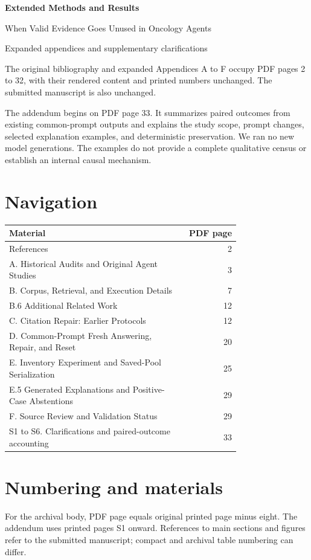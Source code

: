 \documentclass[11pt]{article}
\begin{document}
\begin{center}
{\Large\bfseries Extended Methods and Results}\par\medskip
{\large When Valid Evidence Goes Unused in Oncology Agents}\par\medskip
Expanded appendices and supplementary clarifications
\end{center}
\bigskip
The original bibliography and expanded Appendices A to F occupy PDF pages
2 to 32, with their rendered content and printed numbers unchanged. The
submitted manuscript is also unchanged.

The addendum begins on PDF page 33. It summarizes paired outcomes from existing
common-prompt outputs and explains the study scope, prompt changes, selected
explanation examples, and deterministic preservation. We ran no new model
generations. The examples do not provide a complete qualitative census or
establish an internal causal mechanism.

\section*{Navigation}
\begin{tabular}{@{}p{0.76\linewidth}r@{}}
\toprule
Material & PDF page\\
\midrule
References & 2\\
A. Historical Audits and Original Agent Studies & 3\\
B. Corpus, Retrieval, and Execution Details & 7\\
\quad B.6 Additional Related Work & 12\\
C. Citation Repair: Earlier Protocols & 12\\
D. Common-Prompt Fresh Answering, Repair, and Reset & 20\\
E. Inventory Experiment and Saved-Pool Serialization & 25\\
\quad E.5 Generated Explanations and Positive-Case Abstentions & 29\\
F. Source Review and Validation Status & 29\\
S1 to S6. Clarifications and paired-outcome accounting & 33\\
\bottomrule
\end{tabular}

\section*{Numbering and materials}
For the archival body, PDF page equals original printed page minus eight.
The addendum uses printed pages S1 onward. References to main sections and
figures refer to the submitted manuscript; compact and archival table numbering
can differ.
\end{document}
